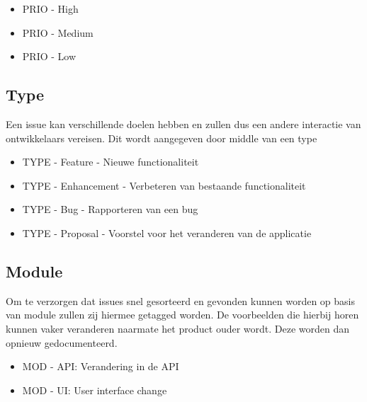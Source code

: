 \begin{itemize}
	\item PRIO - High
	\item PRIO - Medium
	\item PRIO - Low
\end{itemize}

\subsection{Type}

Een issue kan verschillende doelen hebben en zullen dus een andere interactie van ontwikkelaars vereisen. Dit wordt aangegeven door middle van een type

\begin{itemize}
	\item TYPE - Feature - Nieuwe functionaliteit
	\item TYPE - Enhancement - Verbeteren van bestaande functionaliteit
	\item TYPE - Bug - Rapporteren van een bug
	\item TYPE - Proposal - Voorstel voor het veranderen van de applicatie
\end{itemize}

\subsection{Module}

Om te verzorgen dat issues snel gesorteerd en gevonden kunnen worden op basis van module zullen zij hiermee getagged worden. De voorbeelden die hierbij horen kunnen vaker veranderen naarmate het product ouder wordt. Deze worden dan opnieuw gedocumenteerd.

\begin{itemize}
	\item MOD - API: Verandering in de API
	\item MOD - UI: User interface change
\end{itemize}